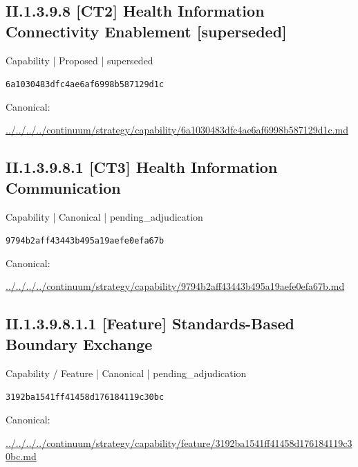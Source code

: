 \documentclass[10pt,a4paper]{article}
\begin{document}
\subsection*{II.1.3.9.8 [CT2] Health Information Connectivity Enablement [superseded]}
\label{element-6a1030483dfc4ae6af6998b587129d1c}
{\small Capability | Proposed | superseded}\par
\texttt{6a1030483dfc4ae6af6998b587129d1c}\par
Canonical: \par
{\footnotesize\url{../../../../continuum/strategy/capability/6a1030483dfc4ae6af6998b587129d1c.md}}\par
\subsection*{II.1.3.9.8.1 [CT3] Health Information Communication}
\label{element-9794b2aff43443b495a19aefe0efa67b}
{\small Capability | Canonical | pending\_adjudication}\par
\texttt{9794b2aff43443b495a19aefe0efa67b}\par
Canonical: \par
{\footnotesize\url{../../../../continuum/strategy/capability/9794b2aff43443b495a19aefe0efa67b.md}}\par
\subsection*{II.1.3.9.8.1.1 [Feature] Standards-Based Boundary Exchange}
\label{element-3192ba1541ff41458d176184119c30bc}
{\small Capability / Feature | Canonical | pending\_adjudication}\par
\texttt{3192ba1541ff41458d176184119c30bc}\par
Canonical: \par
{\footnotesize\url{../../../../continuum/strategy/capability/feature/3192ba1541ff41458d176184119c30bc.md}}\par
\end{document}
